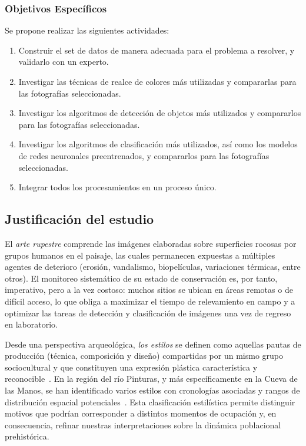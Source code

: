 \subsubsection{Objetivos Específicos}

Se propone realizar las siguientes actividades:
\begin{enumerate}
    \item Construir el set de datos de manera adecuada para el problema a resolver, y validarlo con un experto.
    \item Investigar las técnicas de realce de colores más utilizadas y compararlas para las fotografías seleccionadas.
    \item Investigar los algoritmos de detección de objetos más utilizados y compararlos para las fotografías seleccionadas.
    \item Investigar los algoritmos de clasificación más utilizados, así como los modelos de redes neuronales preentrenados, y compararlos para las fotografías seleccionadas.
    \item Integrar todos los procesamientos en un proceso único.
\end{enumerate}

\subsection{Justificación del estudio}

El \emph{arte rupestre} comprende las imágenes elaboradas sobre superficies rocosas por grupos humanos en el paisaje, las cuales permanecen expuestas a múltiples agentes de deterioro (erosión, vandalismo, biopelículas, variaciones térmicas, entre otros).
El monitoreo sistemático de su estado de conservación es, por tanto, imperativo, pero a la vez costoso: muchos sitios se ubican en áreas remotas o de difícil acceso, lo que obliga a maximizar el tiempo de relevamiento en campo y a optimizar las tareas de detección y clasificación de imágenes una vez de regreso en laboratorio.

Desde una perspectiva arqueológica, \emph{los estilos} se definen como aquellas pautas de producción (técnica, composición y diseño) compartidas por un mismo grupo sociocultural y que constituyen una expresión plástica característica y reconocible~\cite{wiessner1983,aschero2012}.
En la región del río Pinturas, y más específicamente en la Cueva de las Manos, se han identificado varios estilos con cronologías asociadas y rangos de distribución espacial potenciales~\cite{gradin1978,gradin1979,aschero2018b}.
Esta clasificación estilística permite distinguir motivos que podrían corresponder a distintos momentos de ocupación y, en consecuencia, refinar nuestras interpretaciones sobre la dinámica poblacional prehistórica.

